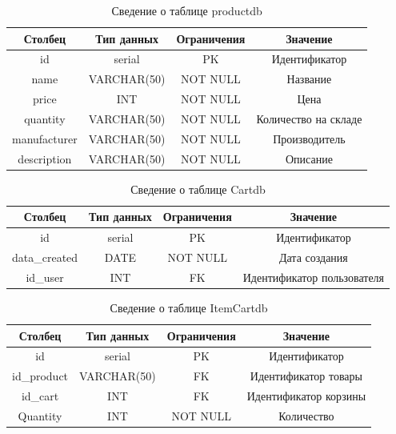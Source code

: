 \begin{table}[H]
	\begin{center}
		\caption{Сведение о таблице productdb}
		\begin{tabular}{|c|c|c|c|}
			\hline
			Столбец & Тип данных & Ограничения & Значение \\
			\hline
			id & serial & PK & Идентификатор \\
			\hline
			name & VARCHAR(50) & NOT NULL & Название \\
			\hline
			price & INT & NOT NULL & Цена\\
			\hline
			quantity & VARCHAR(50) & NOT NULL & Количество на складе\\
			\hline
			manufacturer & VARCHAR(50) & NOT NULL &  Производитель\\
			\hline
			description & VARCHAR(50) & NOT NULL &  Описание\\
			\hline			
		\end{tabular}
		\label{table:db:productdb}
	\end{center}
\end{table}

\begin{table}[H]
	\begin{center}
		\caption{Сведение о таблице Cartdb}
		\begin{tabular}{|c|c|c|c|}
			\hline
			Столбец & Тип данных & Ограничения & Значение \\
			\hline
			id & serial & PK & Идентификатор \\
			\hline
			data\_created & DATE & NOT NULL & Дата создания \\
			\hline
			id\_user & INT & FK & Идентификатор пользователя\\
			\hline			
		\end{tabular}
		\label{table:db:Cartdb}
	\end{center}
\end{table}

\begin{table}[H]
	\begin{center}
		\caption{Сведение о таблице ItemCartdb}
		\begin{tabular}{|c|c|c|c|}
			\hline
			Столбец & Тип данных & Ограничения & Значение \\
			\hline
			id & serial & PK & Идентификатор \\
			\hline
			id\_product & VARCHAR(50) & FK & Идентификатор товары \\
			\hline
			id\_cart & INT & FK & Идентификатор корзины\\
			\hline
			Quantity & INT & NOT NULL & Количество\\
			\hline			
		\end{tabular}
		\label{table:db:ItemCartdb}
	\end{center}
\end{table}

